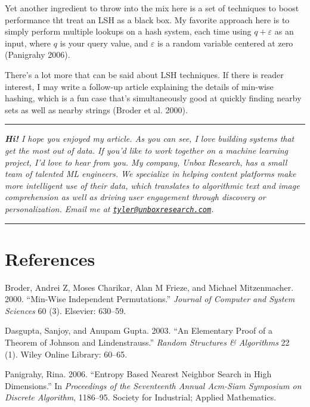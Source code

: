 \documentclass[20pt,]{extarticle}
\begin{document}
Yet another ingredient to throw into the mix here is a set of techniques
to boost performance tht treat an LSH as a black box. My favorite
approach here is to simply perform multiple lookups on a hash system,
each time using \(q + \varepsilon\) as an input, where \(q\) is your
query value, and \(\varepsilon\) is a random variable centered at zero
(Panigrahy 2006).

There's a lot more that can be said about LSH techniques. If there is
reader interest, I may write a follow-up article explaining the details
of min-wise hashing, which is a fun case that's simultaneously good at
quickly finding nearby sets as well as nearby strings (Broder et al.
2000).

\begin{center}\rule{0.5\linewidth}{\linethickness}\end{center}

\emph{\textbf{Hi!} I hope you enjoyed my article. As you can see, I love
building systems that get the most out of data. If you'd like to work
together on a machine learning project, I'd love to hear from you. My
company, Unbox Research, has a small team of talented ML engineers. We
specialize in helping content platforms make more intelligent use of
their data, which translates to algorithmic text and image comprehension
as well as driving user engagement through discovery or personalization.
Email me at
\href{mailto:tyler@unboxresearch.com}{\nolinkurl{tyler@unboxresearch.com}}.}

\begin{center}\rule{0.5\linewidth}{\linethickness}\end{center}

\section*{References}\label{references}

\hypertarget{refs}{}
\hypertarget{ref-broder2000min}{}
Broder, Andrei Z, Moses Charikar, Alan M Frieze, and Michael
Mitzenmacher. 2000. ``Min-Wise Independent Permutations.'' \emph{Journal
of Computer and System Sciences} 60 (3). Elsevier: 630--59.

\hypertarget{ref-dasgupta2003elementary}{}
Dasgupta, Sanjoy, and Anupam Gupta. 2003. ``An Elementary Proof of a
Theorem of Johnson and Lindenstrauss.'' \emph{Random Structures \&
Algorithms} 22 (1). Wiley Online Library: 60--65.

\hypertarget{ref-panigrahy2006entropy}{}
Panigrahy, Rina. 2006. ``Entropy Based Nearest Neighbor Search in High
Dimensions.'' In \emph{Proceedings of the Seventeenth Annual Acm-Siam
Symposium on Discrete Algorithm}, 1186--95. Society for Industrial;
Applied Mathematics.
\end{document}
